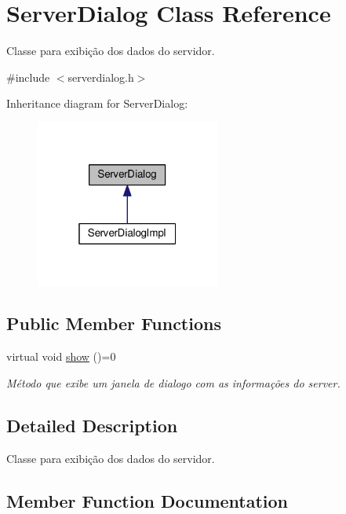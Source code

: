 \hypertarget{classServerDialog}{}\section{Server\+Dialog Class Reference}
\label{classServerDialog}


Classe para exibição dos dados do servidor.  




{\ttfamily \#include $<$serverdialog.\+h$>$}



Inheritance diagram for Server\+Dialog\+:\nopagebreak
\begin{figure}[H]
\begin{center}
\leavevmode
\includegraphics[width=172pt]{d2/d7c/classServerDialog__inherit__graph}
\end{center}
\end{figure}
\subsection*{Public Member Functions}
\begin{DoxyCompactItemize}
\item 
virtual void \hyperlink{classServerDialog_a79906f2c91c29b2504c2cb370d302b00}{show} ()=0
\begin{DoxyCompactList}\small\item\em Método que exibe um janela de dialogo com as informações do server. \end{DoxyCompactList}\end{DoxyCompactItemize}


\subsection{Detailed Description}
Classe para exibição dos dados do servidor. 

\subsection{Member Function Documentation}
